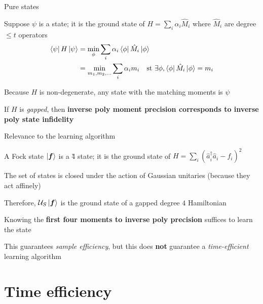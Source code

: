 \begin{frame}{Pure \Gt states}

  \begin{spaceditemize}
    \item Suppose \(\psi\) is a \Gt state; it is the ground state of \(H = \sum_i \alpha_i \hat M_i\) where \(\hat M_i\) are degree \(\leq t\) operators
    \pause
    \begin{align*}
      \bra\psi H \ket\psi
       & = \min_\phi \sum_i \alpha_i \bra\phi \hat M_i \ket\phi                                                     \\
       & = \min_{m_1,m_2,\dots} \sum_i \alpha_i m_i \quad \text{st } \exists \phi, \bra\phi \hat M_i \ket\phi = m_i
    \end{align*}
    \pause
    \item Because \(H\) is non-degenerate, any state with the matching moments is \(\psi\) \pause
    \item If \(H\) is \emph{gapped}, then \textbf{inverse poly moment precision corresponds to inverse poly state infidelity} \parencite{yu2023learningmarginalssuffices}
  \end{spaceditemize}

\end{frame}


\begin{frame}{Relevance to the learning algorithm}
  \begin{spaceditemize}
    \item A Fock state \(\ket{\bm f}\) is a \G4 state; it is the ground state of
    \(H = \sum_i (\hat a_i^\dag \hat a_i - f_i)^2\)
    \item The set of \Gt states is closed under the action of Gaussian unitaries (because they act affinely)
    \pause
    \item Therefore, \(\calU_S\ket{\bm f}\) is the ground state of a gapped degree \(4\) Hamiltonian
    \item Knowing the \textbf{first four moments to inverse poly precision} suffices to learn the state
    \item This guarantees \emph{sample efficiency}\pause, but this does \textbf{not} guarantee a \textit{time-efficient} learning algorithm
  \end{spaceditemize}
\end{frame}


\section{Time efficiency}
\overviewslide[currentsection]



